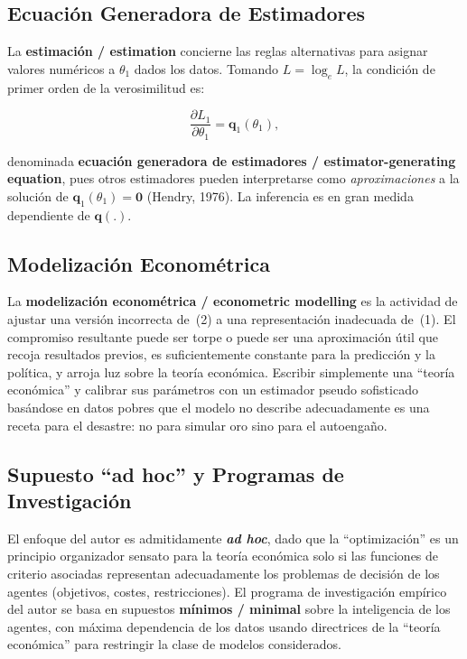 \documentclass[12pt]{article}
\begin{document}
\subsection{Ecuaci\'on Generadora de Estimadores}

La \textbf{estimaci\'on / estimation} concierne las reglas alternativas para asignar valores num\'ericos a $\theta_1$ dados los datos. Tomando $L = \log_e L$, la condici\'on de primer orden de la verosimilitud es:

\begin{equation}
  \frac{\partial L_1}{\partial \theta_1} = \mathbf{q}_1(\theta_1),
\end{equation}

denominada \textbf{ecuaci\'on generadora de estimadores / estimator-generating equation}, pues otros estimadores pueden interpretarse como \textit{aproximaciones} a la soluci\'on de $\mathbf{q}_1(\theta_1) = \mathbf{0}$ (Hendry, 1976). La inferencia es en gran medida dependiente de $\mathbf{q}(.)$.

\subsection{Modelizaci\'on Econom\'etrica}

La \textbf{modelizaci\'on econom\'etrica / econometric modelling} es la actividad de ajustar una versi\'on incorrecta de~(2) a una representaci\'on inadecuada de~(1). El compromiso resultante puede ser torpe o puede ser una aproximaci\'on \'util que recoja resultados previos, es suficientemente constante para la predicci\'on y la pol\'itica, y arroja luz sobre la teor\'ia econ\'omica. Escribir simplemente una ``teor\'ia econ\'omica'' y calibrar sus par\'ametros con un estimador pseudo sofisticado bas\'andose en datos pobres que el modelo no describe adecuadamente es una receta para el desastre: no para simular oro sino para el autoenga\~no.

\subsection{Supuesto ``ad hoc'' y Programas de Investigaci\'on}

El enfoque del autor es admitidamente \textbf{\textit{ad hoc}}, dado que la ``optimizaci\'on'' es un principio organizador sensato para la teor\'ia econ\'omica solo si las funciones de criterio asociadas representan adecuadamente los problemas de decisi\'on de los agentes (objetivos, costes, restricciones). El programa de investigaci\'on emp\'irico del autor se basa en supuestos \textbf{m\'inimos / minimal} sobre la inteligencia de los agentes, con m\'axima dependencia de los datos usando directrices de la ``teor\'ia econ\'omica'' para restringir la clase de modelos considerados.
\end{document}
